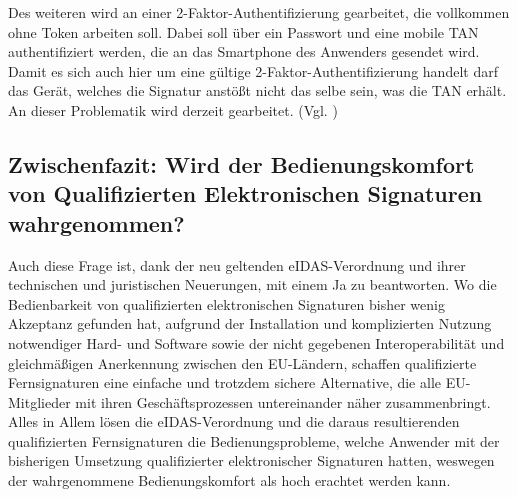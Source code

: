 \documentclass[deutsch]{lib/llncs/llncs}
\begin{document}
Des weiteren wird an einer 2-Faktor-Authentifizierung gearbeitet, die vollkommen ohne Token arbeiten soll. Dabei soll über ein Passwort und eine mobile TAN authentifiziert werden, die an das Smartphone des Anwenders gesendet wird. Damit es sich auch hier um eine gültige 2-Faktor-Authentifizierung handelt darf das Gerät, welches die Signatur anstößt nicht das selbe sein, was die TAN erhält. An dieser Problematik wird derzeit gearbeitet. (Vgl. \cite[S. 32]{Zitat08})


\subsection{Zwischenfazit: Wird der Bedienungskomfort von Qualifizierten Elektronischen Signaturen wahrgenommen?}
Auch diese Frage ist, dank der neu geltenden eIDAS-Verordnung und ihrer technischen und juristischen Neuerungen, mit einem Ja zu beantworten. Wo die Bedienbarkeit von qualifizierten elektronischen Signaturen bisher wenig Akzeptanz gefunden hat, aufgrund der Installation und komplizierten Nutzung notwendiger Hard- und Software sowie der nicht gegebenen Interoperabilität und gleichmäßigen Anerkennung zwischen den EU-Ländern, schaffen qualifizierte Fernsignaturen eine einfache und trotzdem sichere Alternative, die alle EU-Mitglieder mit ihren Geschäftsprozessen untereinander näher zusammenbringt. \\
Alles in Allem lösen die eIDAS-Verordnung und die daraus resultierenden qualifizierten Fernsignaturen die Bedienungsprobleme, welche Anwender mit der bisherigen Umsetzung qualifizierter elektronischer Signaturen hatten, weswegen der wahrgenommene Bedienungskomfort als hoch erachtet werden kann.
\end{document}
